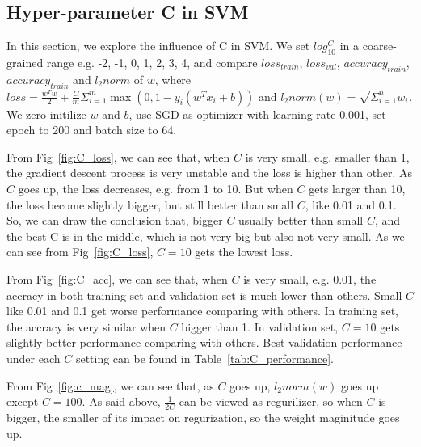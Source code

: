 \documentclass[journal, a4paper]{IEEEtran}
\begin{document}
\subsection{Hyper-parameter C in SVM}
In this section, we explore the influence of C in SVM. We set $log_{10}^{C}$ in a coarse-grained range e.g. -2, -1, 0, 1, 2, 3, 4, and compare $loss_{train}$, $loss_{val}$, $accuracy_{train}$, $accuracy_{train}$ and $l_2norm$ of $w$, where $loss =  \frac{w^Tw}{2} + \frac{C}{m}\Sigma_{i=1}^m \max(0, 1 - y_i(w^Tx_i + b))$ and $ l_2norm(w) = \sqrt{\Sigma_{i=1}^n w_i}$. We zero initilize $w$ and $b$, use SGD as optimizer with learning rate 0.001, set epoch to 200 and batch size to 64. \par
From Fig~\ref{fig:C_loss}, we can see that, when $C$ is very small, e.g. smaller than 1, the gradient descent process is very unstable and the loss is higher than other. As $C$ goes up, the loss decreases, e.g. from 1 to 10. But when $C$ gets larger than 10, the loss become slightly bigger, but still better than small $C$, like 0.01 and 0.1. So, we can draw the conclusion that, bigger $C$ usually better than small $C$, and the best C is in the middle, which is not very big but also not very small. As we can see from Fig~\ref{fig:C_loss}, $C = 10$ gets the lowest loss.   \par
From Fig~\ref{fig:C_acc}, we can see that, when $C$ is very small, e.g. 0.01, the accracy in both training set and validation set is much lower than others. Small $C$ like 0.01 and 0.1 get worse performance comparing with others. In training set, the accracy is very similar when $C$ bigger than 1. In validation set, $C = 10$ gets slightly better performance comparing with others. Best validation performance under each $C$ setting can be found in Table~\ref{tab:C_performance}. \par
From Fig~\ref{fig:c_mag}, we can see that, as $C$ goes up, $l_2norm(w)$ goes up except $C = 100$. As said above, $\frac{1}{2C}$ can be viewed as regurilizer, so when $C$ is bigger, the smaller of its impact on regurization, so the weight maginitude goes up. 
\end{document}
